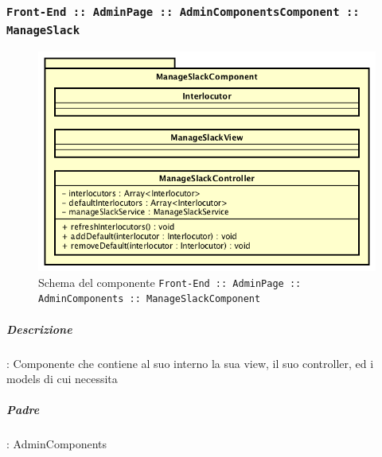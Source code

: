 \documentclass[../DefinizioneDiProdotto_v3.0.0.tex]{subfiles}
\begin{document}
	\newpage
	\subsubsection{\texttt{Front-End :: AdminPage :: AdminComponentsComponent :: ManageSlack}}
	\begin{figure}[!h]
		\centering
		\includegraphics[scale=0.7]{Architettura/Front-End/AdminPage/AdminComponents/ManageSlackComponent.png}
		\caption{Schema del componente \texttt{Front-End :: AdminPage :: AdminComponents :: ManageSlackComponent}}
	\end{figure}
			\subparagraph{Descrizione}: Componente che contiene al suo interno la sua view, il suo controller, ed i models di cui necessita
			\subparagraph{Padre}: AdminComponents
\end{document}
